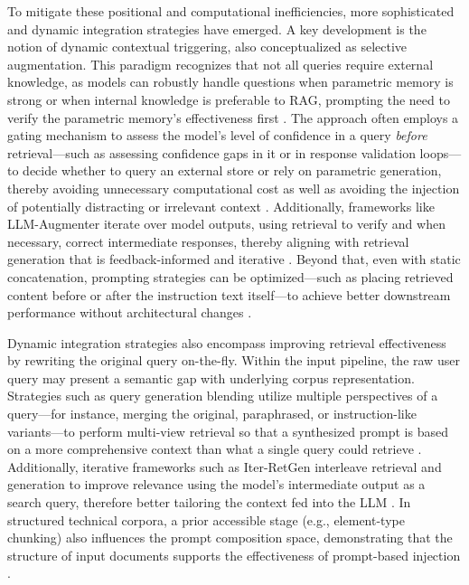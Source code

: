 \documentclass[11pt,a4paper]{article}
\begin{document}
To mitigate these positional and computational inefficiencies, more sophisticated and dynamic integration strategies have emerged. A key development is the notion of dynamic contextual triggering, also conceptualized as selective augmentation. This paradigm recognizes that not all queries require external knowledge, as models can robustly handle questions when parametric memory is strong or when internal knowledge is preferable to RAG, prompting the need to verify the parametric memory's effectiveness first \cite{arxiv:2212.10511v4}. The approach often employs a gating mechanism to assess the model's level of confidence in a query \emph{before} retrieval---such as assessing confidence gaps in it or in response validation loops---to decide whether to query an external store or rely on parametric generation, thereby avoiding unnecessary computational cost as well as avoiding the injection of potentially distracting or irrelevant context \cite{arxiv:2408.08067v2,arxiv:2302.12813v3}. Additionally, frameworks like LLM-Augmenter iterate over model outputs, using retrieval to verify and when necessary, correct intermediate responses, thereby aligning with retrieval generation that is feedback-informed and iterative \cite{arxiv:2302.12813v3}. Beyond that, even with static concatenation, prompting strategies can be optimized---such as placing retrieved content before or after the instruction text itself---to achieve better downstream performance without architectural changes \cite{arxiv:2305.14627v2,arxiv:2404.08865v1}.

Dynamic integration strategies also encompass improving retrieval effectiveness by rewriting the original query on-the-fly. Within the input pipeline, the raw user query may present a semantic gap with underlying corpus representation. Strategies such as query generation blending utilize multiple perspectives of a query---for instance, merging the original, paraphrased, or instruction-like variants---to perform multi-view retrieval so that a synthesized prompt is based on a more comprehensive context than what a single query could retrieve \cite{arxiv:2409.15012v1,arxiv:2010.03073v1}. Additionally, iterative frameworks such as Iter-RetGen interleave retrieval and generation to improve relevance using the model's intermediate output as a search query, therefore better tailoring the context fed into the LLM \cite{arxiv:2305.15294v2}. In structured technical corpora, a prior accessible stage (e.g., element-type chunking) also influences the prompt composition space, demonstrating that the structure of input documents supports the effectiveness of prompt-based injection \cite{arxiv:2402.05131v3}.
\end{document}
